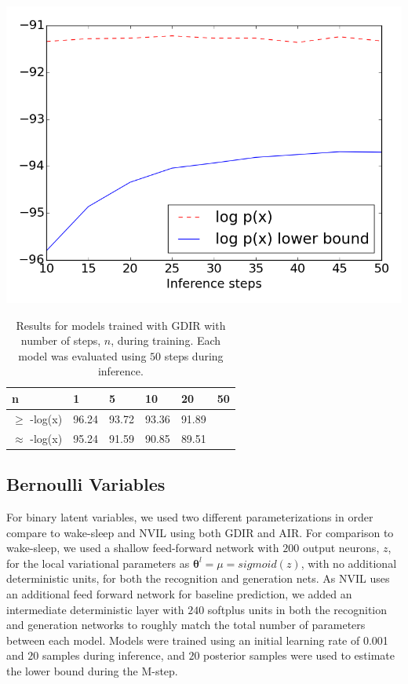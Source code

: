 \documentclass{article} %
\newcommand{\vects}[1]{\boldsymbol{#1}}
\newcommand{\TT}[0]{\vects{\theta}}
\begin{document}
\begin{minipage}{\textwidth}
\begin{minipage}[r]{0.4\textwidth}
        \includegraphics[scale=0.3]{figures/continuous_eval}
        \label{fig:continuous}
        \end{minipage}
\end{minipage}

\begin{table}
\begin{tabular}{ | m{1.4cm} | m{1cm} | m{1cm} | m{1cm} | m{1cm} | m{1cm} |}
\hline
n & 1 & 5 & 10 & 20 & 50 \\
\hline
$\ge$ -log(x) & 96.24 & 93.72 & 93.36 & 91.89 & \\
\hline
$\approx$ -log(x) & 95.24 & 91.59 & 90.85 & 89.51 & \\
\hline
\end{tabular}
\caption{Results for models trained with GDIR with number of steps, $n$, during training. Each model was evaluated using $50$ steps during inference.}
\label{table:cont_step}
\end{table}

\subsection{Bernoulli Variables}
For binary latent variables, we used two different parameterizations in order compare to wake-sleep and
NVIL using both GDIR and AIR. For comparison to wake-sleep, we used a shallow
feed-forward network with $200$ output neurons, $z$, for the local variational parameters as $\TT^l = \mu = sigmoid(z)$, with no additional deterministic units, for both the recognition and generation nets.
As NVIL uses an additional feed forward network for baseline prediction, we added
an intermediate deterministic layer with $240$ softplus units in both the recognition and generation
networks to roughly match the total number of parameters between each model. Models
were trained using an initial learning rate of \num{0.001} and $20$ samples
during inference, and $20$ posterior samples were used to estimate the lower bound during the
M-step.
\end{document}
